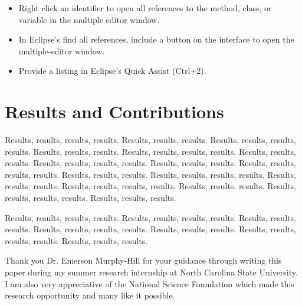 \documentclass{sigplanconf}
\begin{document}
\begin{itemize}
  \item Right click an identifier to open all references to the method, class,
      or variable in the multiple editor window.
  \item In Eclipse's find all references, include a button on the interface
      to open the multiple-editor window.
  \item Provide a listing in Eclipse's Quick Assist (Ctrl+2).
\end{itemize}


\section{Results and Contributions}
Results, results, results, results. Results, results, results.
Results, results, results, results. Results, results, results.
Results, results, results, results. Results, results, results.
Results, results, results, results. Results, results, results.
Results, results, results, results. Results, results, results.
Results, results, results, results. Results, results, results.
Results, results, results, results. Results, results, results.
Results, results, results, results. Results, results, results.

Results, results, results, results. 
Results, results, results, results. Results, results, results.
Results, results, results, results. Results, results, results.
Results, results, results, results. Results, results, results.

\appendix
% 

\acks
Thank you Dr. Emerson Murphy-Hill for your guidance through writing this
paper during my summer research internship at North Carolina State University.
I am also very appreciative of the National Science Foundation which made this
research opportunity and many like it possible.





\softraggedright

\end{document}
